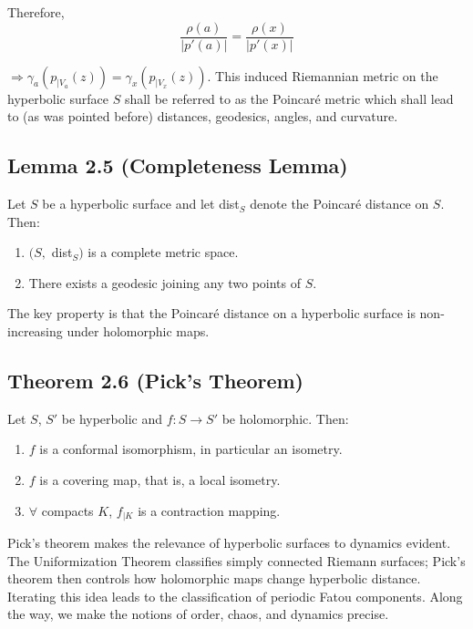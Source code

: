 \documentclass[11pt,a4paper]{article}
\begin{document}
        Therefore,
        $$\frac{\rho(a)}{|p'(a)|} = \frac{\rho(x)}{|p'(x)|}$$

        $\Rightarrow \gamma_a(p_{\big|V_a}(z)) = \gamma_x(p_{\big|V_x}(z))$. This induced Riemannian metric on the hyperbolic surface $S$ shall be referred to as the Poincar\'e metric which shall lead to (as was pointed before) distances, geodesics, angles, and curvature.

        \subsection*{Lemma 2.5 (Completeness Lemma)} Let $S$ be a hyperbolic surface and let dist$_S$ denote the Poincar\'e distance on $S$. Then:
        \begin{enumerate}
            \item [(a)] $(S,$ dist$_S)$ is a complete metric space.
            \item [(b)] There exists a geodesic joining any two points of $S$.
        \end{enumerate}



        The key property is that the Poincar\'e distance on a hyperbolic surface is non-increasing under holomorphic maps.

        \subsection*{Theorem 2.6 (Pick's Theorem)} Let $S$, $S'$ be hyperbolic and $f: S \rightarrow S'$ be holomorphic. Then:
        \begin{enumerate}
            \item $f$ is a conformal isomorphism, in particular an isometry.
            \item $f$ is a covering map, that is, a local isometry.
            \item $\forall$ compacts $K$, $f_{\big|K}$ is a contraction mapping.
        \end{enumerate}



        Pick's theorem makes the relevance of hyperbolic surfaces to dynamics evident. The Uniformization Theorem classifies simply connected Riemann surfaces; Pick's theorem then controls how holomorphic maps change hyperbolic distance. Iterating this idea leads to the classification of periodic Fatou components. Along the way, we make the notions of order, chaos, and dynamics precise.
\end{document}

